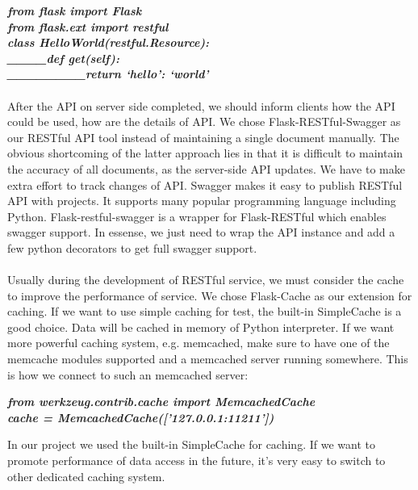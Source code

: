 \documentclass[12pt,oneside,a4paper]{article}
\begin{document}
\scriptsize{\textbf{\emph{from flask import Flask\\
from flask.ext import restful\\
class HelloWorld(restful.Resource):\\
\_\_\_\_def get(self):\\ 
\_\_\_\_\_\_\_\_return {`hello': `world'}}}}\\\\
\normalsize{After the API on server side completed, we should inform clients how the API could be used, how are the details of API. We chose Flask-RESTful-Swagger as our RESTful API tool instead of maintaining a single document manually. The obvious shortcoming of the latter approach lies in that it is difficult to maintain the accuracy of all documents, as the server-side API updates. We have to make extra effort to track changes of API. Swagger makes it easy to publish RESTful API with projects. It supports many popular programming language including Python. Flask-restful-swagger is a wrapper for Flask-RESTful which enables swagger support. In essense, we just need to wrap the API instance and add a few python decorators to get full swagger support.\\\\
Usually during the development of RESTful service, we must consider the cache to improve the performance of service. We chose Flask-Cache as our extension for caching. If we want to use simple caching for test, the built-in SimpleCache is a good choice. Data will be cached in memory of Python interpreter. If we want more powerful caching system, e.g. memcached, make sure to have one of the memcache modules supported and a memcached server running somewhere. This is how we connect to such an memcached server:\\}

\scriptsize{\textbf{\emph{from werkzeug.contrib.cache import MemcachedCache\\
cache = MemcachedCache(['127.0.0.1:11211'])\\}}}

\normalsize{In our project we used the built-in SimpleCache for caching. If we want to promote performance of data access in the future, it's very easy to switch to other dedicated caching system.\\}
\end{document}
